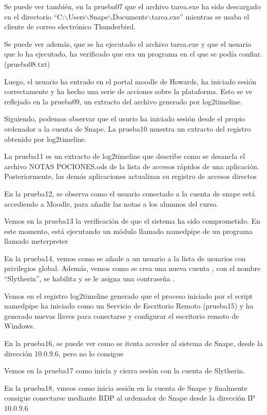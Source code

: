 Se puede ver también, en la prueba07 que el archivo tarea.exe ha sido descargado en el directorio ``C:$\backslash$Users$\backslash$Snape$\backslash$Documents$\backslash$tarea.exe'' mientras se usaba el cliente de correo electrónico Thunderbird.

Se puede ver además, que se ha ejecutado el archivo tarea.exe y que el usuario que lo ha ejecutado, ha verificado que era un programa en el que se podía confiar. (prueba08.txt)

Luego, el usuario ha entrado en el portal moodle de Howards, ha iniciado sesión correctamente y ha hecho una serie de acciones sobre la plataforma. Esto se ve reflejado en la prueba09, un extracto del archivo generado por log2timeline.

Siguiendo, podemos observar que el usurio ha iniciado sesión desde el propio ordenador a la cuenta de Snape.
La prueba10 muestra un extracto del registro obtenido por log2timeline.

La prueba11 es un extracto de log2timeline que describe como se desancla el archivo NOTAS POCIONES.ods de la lista de accesos rápidos de una aplicación.
Posteriormente, las demás aplicaciones actualizan su registro de accesos directos \cite{813711}

En la prueba12, se observa como el usuario conectado a la cuenta de snape está accediendo a Moodle, para añadir las notas a los alumnos del curso.

Vemos en la prueba13 la verificación de que el sistema ha sido comprometido.
En este momento, está ejecutando un módulo llamado namedpipe \cite{namedpipe} de un programa llamado meterpreter \cite{meterpreter}

En la prueba14, vemos como se añade a un usuario a la lista de usuarios con privilegios global. \cite{4728}
Además, vemos como se crea una nueva cuenta \cite{4720}, con el nombre ``Slytherin'', se habilita \cite{4722} y se le asigna una contraseña \cite{4724}.

Vemos en el registro log2timeline generado que el proceso iniciado por el script namedpipe ha iniciado como un Servicio de Escritorio Remoto (prueba15) y ha generado nuevas llaves para conectarse y configurar el escritorio remoto de Windows.

En la prueba16, se puede ver como se itenta acceder al sistema de Snape, desde la dirección 10.0.9.6, pero no lo consigue

Vemos en la prueba17 como inicia y cierra sesión con la cuenta de Slytherin.

En la prueba18, vmeos como inicia sesión en la cuenta de Snape y finalmente consigue conectarse mediante RDP al ordenador de Snape desde la dirección IP 10.0.9.6

